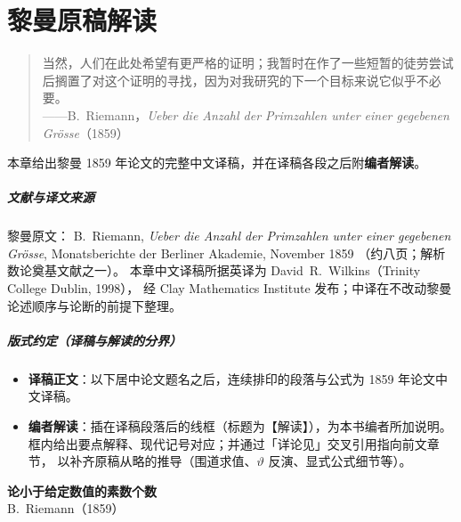 \chapter{黎曼原稿解读}\label{ch:riemann_original_interpretation}

\vspace{0.6em}
\begin{quote}
\small
当然，人们在此处希望有更严格的证明；我暂时在作了一些短暂的徒劳尝试后搁置了对这个证明的寻找，因为对我研究的下一个目标来说它似乎不必要。\\[4pt]
\hfill——B.~Riemann，\textit{Ueber die Anzahl der Primzahlen unter einer gegebenen Gr\"{o}sse}（1859）
\end{quote}
\vspace{0.6em}

本章给出黎曼 1859 年论文的完整中文译稿，并在译稿各段之后附\textbf{编者解读}。

\paragraph{文献与译文来源}
黎曼原文：
B.~Riemann,
\textit{Ueber die Anzahl der Primzahlen unter einer gegebenen Gr\"{o}sse},
Monatsberichte der Berliner Akademie, November 1859
（约八页；解析数论奠基文献之一）。
本章中文译稿所据英译为 David~R.~Wilkins（Trinity College Dublin, 1998），
经 Clay Mathematics Institute 发布；中译在不改动黎曼论述顺序与论断的前提下整理。

\paragraph{版式约定（译稿与解读的分界）}
\begin{itemize}
  \item \textbf{译稿正文}：以下居中论文题名之后，连续排印的段落与公式为 1859 年论文中文译稿。
  \item \textbf{编者解读}：插在译稿段落后的线框（标题为【解读】），为本书编者所加说明。
        框内给出要点解释、现代记号对应；并通过「详论见」交叉引用指向前文章节，
        以补齐原稿从略的推导（围道求值、$\vartheta$ 反演、显式公式细节等）。
\end{itemize}

\vspace{1.5em}
\begin{center}
{\LARGE\bfseries 论小于给定数值的素数个数}\\[0.6em]
{\Large B.~Riemann（1859）}
\end{center}

\vspace{1.2em}

